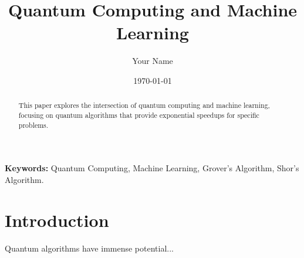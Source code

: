 \documentclass{article}
\begin{document}
\title{Quantum Computing and Machine Learning}
\author{Your Name}
\date{\today}
\maketitle

\begin{abstract}
This paper explores the intersection of quantum computing and machine learning, focusing on quantum algorithms that provide exponential speedups for specific problems.
\end{abstract}

\textbf{Keywords:} Quantum Computing, Machine Learning, Grover's Algorithm, Shor's Algorithm.

\section{Introduction}
Quantum algorithms have immense potential...
\end{document}
